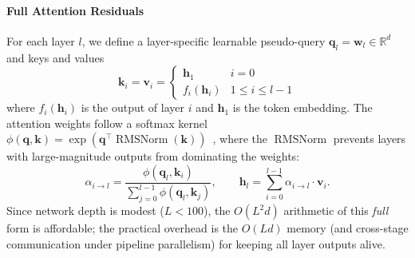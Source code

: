\paragraph{Full Attention Residuals} For each layer $l$, we define a layer-specific learnable pseudo-query $\bm{q}_l = \bm{w}_l \in \mathbb{R}^d$ and keys and values
\begin{equation}
    \bm{k}_{i} = \bm{v}_{i} = \begin{cases} \bm{h}_1 & i = 0 \\ f_i(\bm{h}_{i}) & 1 \leq i \leq l-1 \end{cases}
    \label{eq:attnres-qkv}
\end{equation}
where $f_i(\bm{h}_i)$ is the output of layer $i$ and $\bm{h}_1$ is the token embedding. The attention weights follow a softmax kernel $\phi(\bm{q}, \bm{k}) = \exp\left(\bm{q}^\top\operatorname{RMSNorm}(\bm{k})\right)$~\citep{katharopoulos-2020-transformers,zhang2019root}, where the $\operatorname{RMSNorm}$ prevents layers with large-magnitude outputs from dominating the weights:
\begin{equation}
    {\alpha_{i \to l}} = \frac{\phi\left(\bm{q}_{l}, \bm{k}_{i}\right)}{\sum_{j=0}^{l-1} \phi\left(\bm{q}_{l}, \bm{k}_{j}\right)},
    \qquad
    \bm{h}_{l} = \sum_{i=0}^{l-1} {\alpha_{i \to l}} \cdot \bm{v}_{i}.
    \label{eq:attnres-full}
\end{equation}
Since network depth is modest ($L < 100$), the $O(L^2 d)$ arithmetic of this \emph{full} form is affordable; the practical overhead is the $O(Ld)$ memory (and cross-stage communication under pipeline parallelism) for keeping all layer outputs alive.

